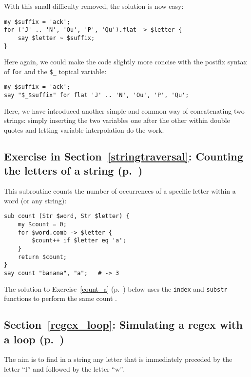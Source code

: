 With this small difficulty removed, the solution is now easy:

\begin{verbatim}
my $suffix = 'ack';
for ('J' .. 'N', 'Ou', 'P', 'Qu').flat -> $letter {
    say $letter ~ $suffix;
}
\end{verbatim}
%

Here again, we could make the code slightly more concise with 
the postfix syntax of {\tt for} and the \verb'$_' topical 
variable:

\begin{verbatim}
my $suffix = 'ack';
say "$_$suffix" for flat 'J' .. 'N', 'Ou', 'P', 'Qu';
\end{verbatim}
%

Here, we have introduced another simple and common way of 
concatenating two strings: simply inserting the two 
variables one after the other within double quotes and 
letting variable interpolation do the work.


\subsection{Exercise in Section~\ref{stringtraversal}: Counting the letters of a string (p.~\pageref{stringtraversal})}
\label{sol_count_letters}

This subroutine counts the number of occurrences of 
a specific letter within a word (or any string):

\begin{verbatim}
sub count (Str $word, Str $letter) {
    my $count = 0;
    for $word.comb -> $letter {
        $count++ if $letter eq 'a';
    }
    return $count;   
}
say count "banana", "a";   # -> 3
\end{verbatim}
%

The solution to Exercise~\ref{count_a} 
(p.~\pageref{sol_count_a}) below uses the 
{\tt index} and {\tt substr} functions to perform 
the same count .


\subsection{Section~\ref{regex_loop}: Simulating a regex with a loop (p.~\pageref{regex_loop})}
\label{sol_regex_loop}

The aim is to find in a string any letter that is 
immediately preceded by the letter ``l'' and followed by 
the letter ``w''.

